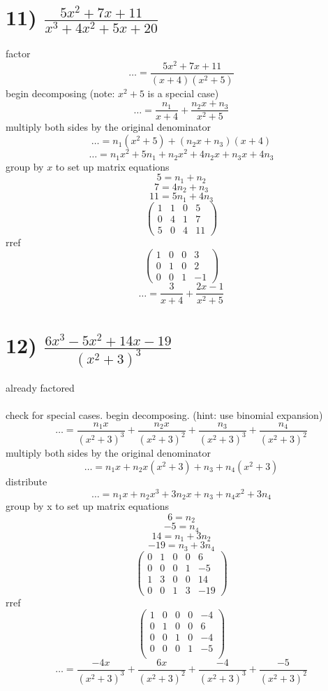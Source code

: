 \documentclass[12pt]{article}
\begin{document}
  \section*{11) $\frac{5x^2+7x+11}{x^3+4x^2+5x+20}$}
  factor
  $$\ldots=\frac{5x^2+7x+11}{(x+4)(x^2+5)}$$
  begin decomposing (note: $x^2+5$ is a special case)
  $$\ldots=\frac{n_1}{x+4}+\frac{n_2x+n_3}{x^2+5}$$
  multiply both sides by the original denominator
  $$\ldots=n_1(x^2+5)+(n_2x+n_3)(x+4)$$
  $$\ldots=n_1x^2+5n_1+n_2x^2+4n_2x+n_3x+4n_3$$
  group by $x$ to set up matrix equations
  $$5=n_1+n_2$$
  $$7=4n_2+n_3$$
  $$11=5n_1+4n_3$$
  $$
  \left(
    \begin{array}{ccc|c}
      1 & 1 & 0 & 5 \\ 
      0 & 4 & 1 & 7 \\ 
      5 & 0 & 4 & 11
    \end{array}
  \right)
  $$
  rref 
  $$
  \left(
    \begin{array}{ccc|c}
      1 & 0 & 0 & 3 \\ 
      0 & 1 & 0 & 2 \\ 
      0 & 0 & 1 & -1
    \end{array}
  \right)
  $$
  $$\ldots=\frac{3}{x+4}+\frac{2x-1}{x^2+5}$$ \newpage
  \section*{12) $\frac{6x^3-5x^2+14x-19}{(x^2+3)^3}$}
  already factored\\ \\ 
  check for special cases. begin decomposing. (hint: use binomial expansion)
  $$\ldots=\frac{n_1x}{(x^2+3)^3}+\frac{n_2x}{(x^2+3)^2}+\frac{n_3}{(x^2+3)^3}+\frac{n_4}{(x^2+3)^2}$$
  multiply both sides by the original denominator
  $$\ldots=n_1x+n_2x(x^2+3)+n_3+n_4(x^2+3)$$
  distribute
  $$\ldots=n_1x+n_2x^3+3n_2x+n_3+n_4x^2+3n_4$$
  group by x to set up matrix equations
  $$6=n_2$$
  $$-5=n_4$$
  $$14=n_1+3n_2$$
  $$-19=n_3+3n_4$$
  $$
  \left(
    \begin{array}{cccc|c}
      0 & 1 & 0 & 0 & 6 \\ 
      0 & 0 & 0 & 1 & -5 \\ 
      1 & 3 & 0 & 0 & 14 \\
      0 & 0 & 1 & 3 & -19
    \end{array}
  \right)
  $$
  rref
  $$
  \left(
    \begin{array}{cccc|c}
      1 & 0 & 0 & 0 & -4 \\ 
      0 & 1 & 0 & 0 & 6 \\
      0 & 0 & 1 & 0 & -4 \\
      0 & 0 & 0 & 1 & -5 \\ 
    \end{array}
  \right)
  $$
  $$\ldots=\frac{-4x}{(x^2+3)^3}+\frac{6x}{(x^2+3)^2}+\frac{-4}{(x^2+3)^3}+\frac{-5}{(x^2+3)^2}$$
\end{document}
